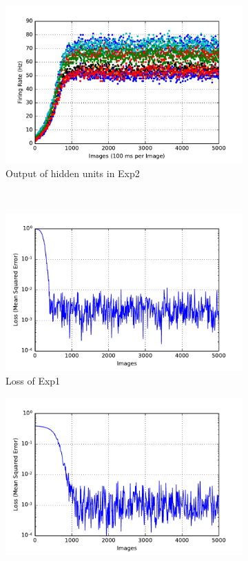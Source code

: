 \begin{figure}
\begin{subfigure}[t]{0.4\textwidth}
		\includegraphics[width=\textwidth]{pics_sdlm/17_exp_SRBM_all_long/exp2_hid_s.pdf}
		\caption{Output of hidden units in Exp2}
	\end{subfigure}\\
	\begin{subfigure}[t]{0.4\textwidth}
		\includegraphics[width=\textwidth]{pics_sdlm/17_exp_SRBM_all_long/exp1_mse_nons.pdf}
		\caption{Loss of Exp1}
	\end{subfigure}
	\begin{subfigure}[t]{0.4\textwidth}
		\includegraphics[width=\textwidth]{pics_sdlm/17_exp_SRBM_all_long/exp2_mse_nons.pdf}

\end{subfigure}
\end{figure}
